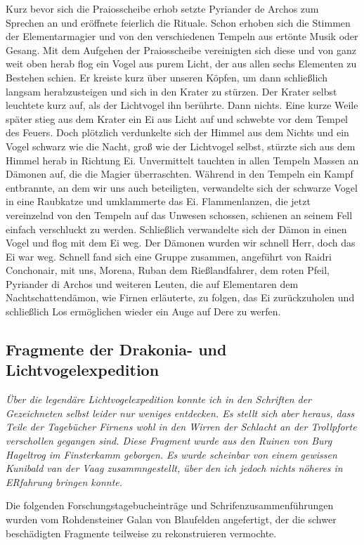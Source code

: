 Kurz bevor sich die Praiosscheibe erhob setzte Pyriander de Archos zum Sprechen an und eröffnete feierlich die Rituale. Schon erhoben sich die Stimmen der Elementarmagier und von den verschiedenen Tempeln aus ertönte Musik oder Gesang. Mit dem Aufgehen der Praiosscheibe vereinigten sich diese und von ganz weit oben herab flog ein Vogel aus purem Licht, der aus allen sechs Elementen zu Bestehen schien. Er kreiste kurz über unseren Köpfen, um dann schließlich langsam herabzusteigen und sich in den Krater zu stürzen. Der Krater selbst leuchtete kurz auf, als der Lichtvogel ihn berührte. Dann nichts. Eine kurze Weile später stieg aus dem Krater ein Ei aus Licht auf und schwebte vor dem Tempel des Feuers. Doch plötzlich verdunkelte sich der Himmel aus dem Nichts und ein Vogel schwarz wie die Nacht, groß wie der Lichtvogel selbst, stürzte sich aus dem Himmel herab in Richtung Ei. Unvermittelt tauchten in allen Tempeln Massen an Dämonen auf, die die Magier überraschten. Während in den Tempeln ein Kampf entbrannte, an dem wir uns auch beteiligten, verwandelte sich der schwarze Vogel in eine Raubkatze und umklammerte das Ei. Flammenlanzen, die jetzt vereinzelnd von den Tempeln auf das Unwesen schossen, schienen an seinem Fell einfach verschluckt zu werden. Schließlich verwandelte sich der Dämon in einen Vogel und flog mit dem Ei weg. Der Dämonen wurden wir schnell Herr, doch das Ei war weg. Schnell fand sich eine Gruppe zusammen, angeführt von Raidri Conchonair, mit uns, Morena, Ruban dem Rießlandfahrer, dem roten Pfeil, Pyriander di Archos und weiteren Leuten, die auf Elementaren dem Nachtschattendämon, wie Firnen erläuterte, zu folgen, das Ei zurückzuholen und schließlich Los ermöglichen wieder ein Auge auf Dere zu werfen.

\subsection{Fragmente der Drakonia- und Lichtvogelexpedition}

{\itshape
Über die legendäre Lichtvogelexpedition konnte ich in den Schriften der Gezeichneten selbst leider nur weniges entdecken. Es stellt sich aber heraus, dass Teile der Tagebücher Firnens wohl in den Wirren der Schlacht an der Trollpforte verschollen gegangen sind. Diese Fragment wurde aus den Ruinen von Burg Hageltrog im Finsterkamm geborgen.
Es wurde scheinbar von einem gewissen Kunibald van der Vaag zusammngestellt, über den ich jedoch nichts nöheres in ERfahrung bringen konnte.

Die folgenden Forschungstagebucheinträge und Schrifenzusammenführungen wurden vom Rohdensteiner Galan von Blaufelden angefertigt, der die schwer beschädigten Fragmente teilweise zu rekonstruieren vermochte.}

